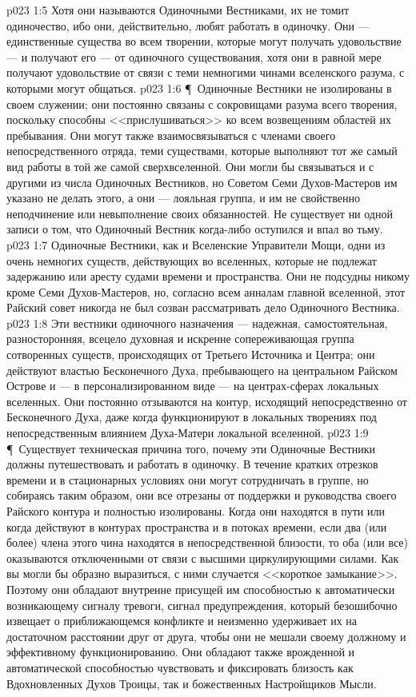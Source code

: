 \vs p023 1:5 Хотя они называются Одиночными Вестниками, их не томит одиночество, ибо они, действительно, любят работать в одиночку. Они --- единственные существа во всем творении, которые могут получать удовольствие --- и получают его --- от одиночного существования, хотя они в равной мере получают удовольствие от связи с теми немногими чинами вселенского разума, с которыми могут общаться.
\vs p023 1:6 \P\ Одиночные Вестники не изолированы в своем служении; они постоянно связаны с сокровищами разума всего творения, поскольку способны <<прислушиваться>> ко всем возвещениям областей их пребывания. Они могут также взаимосвязываться с членами своего непосредственного отряда, теми существами, которые выполняют тот же самый вид работы в той же самой сверхвселенной. Они могли бы связываться и с другими из числа Одиночных Вестников, но Советом Семи Духов\hyp{}Мастеров им указано не делать этого, а они --- лояльная группа, и им не свойственно неподчинение или невыполнение своих обязанностей. Не существует ни одной записи о том, что Одиночный Вестник когда\hyp{}либо оступился и впал во тьму.
\vs p023 1:7 Одиночные Вестники, как и Вселенские Управители Мощи, одни из очень немногих существ, действующих во вселенных, которые не подлежат задержанию или аресту судами времени и пространства. Они не подсудны никому кроме Семи Духов\hyp{}Мастеров, но, согласно всем анналам главной вселенной, этот Райский совет никогда не был созван рассматривать дело Одиночного Вестника.
\vs p023 1:8 Эти вестники одиночного назначения --- надежная, самостоятельная, разносторонняя, всецело духовная и искренне сопереживающая группа сотворенных существ, происходящих от Третьего Источника и Центра; они действуют властью Бесконечного Духа, пребывающего на центральном Райском Острове и --- в персонализированном виде --- на центрах\hyp{}сферах локальных вселенных. Они постоянно отзываются на контур, исходящий непосредственно от Бесконечного Духа, даже когда функционируют в локальных творениях под непосредственным влиянием Духа\hyp{}Матери локальной вселенной.
\vs p023 1:9 \P\ Существует техническая причина того, почему эти Одиночные Вестники должны путешествовать и работать в одиночку. В течение кратких отрезков времени и в стационарных условиях они могут сотрудничать в группе, но собираясь таким образом, они все отрезаны от поддержки и руководства своего Райского контура и полностью изолированы. Когда они находятся в пути или когда действуют в контурах пространства и в потоках времени, если два (или более) члена этого чина находятся в непосредственной близости, то оба (или все) оказываются отключенными от связи с высшими циркулирующими силами. Как вы могли бы образно выразиться, с ними случается <<короткое замыкание>>. Поэтому они обладают внутренне присущей им способностью к автоматически возникающему сигналу тревоги, сигнал предупреждения, который безошибочно извещает о приближающемся конфликте и неизменно удерживает их на достаточном расстоянии друг от друга, чтобы они не мешали своему должному и эффективному функционированию. Они обладают также врожденной и автоматической способностью чувствовать и фиксировать близость как Вдохновленных Духов Троицы, так и божественных Настройщиков Мысли.
